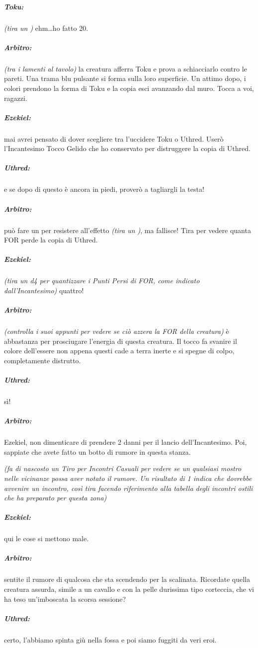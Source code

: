 \documentclass[itdr]{subfiles}
\begin{document}
{\subparagraph{Toku:} {\em (tira un )} ehm\ldots ho fatto 20.

\subparagraph{Arbitro:} {\em (tra i lamenti al tavolo)} la creatura afferra Toku e prova a schiacciarlo contro le pareti. Una trama blu pulsante si forma sulla loro superficie. Un attimo dopo, i colori prendono la forma di Toku e la copia esci avanzando dal muro. Tocca a voi, ragazzi.

\subparagraph{Ezekiel:} mai avrei pensato di dover scegliere tra l'uccidere Toku o Uthred. Userò l'Incantesimo Tocco Gelido che ho conservato per distruggere la copia di Uthred.

\subparagraph{Uthred:} e se dopo di questo è ancora in piedi, proverò a tagliargli la testa!

\subparagraph{Arbitro:} può fare un  per resistere all'effetto {\em (tira un )}, ma fallisce! Tira per vedere quanta FOR perde la copia di Uthred.

\subparagraph{Ezekiel:} {\em (tira un d4 per quantizzare i Punti Persi di FOR, come indicato dall'Incantesimo)} quattro!

\subparagraph{Arbitro:} {\em (controlla i suoi appunti per vedere se ciò azzera la FOR della creatura)} è abbastanza per prosciugare l'energia di questa creatura. Il tocco fa svanire il colore dell'essere non appena questi cade a terra inerte e si spegne di colpo, completamente distrutto.

\subparagraph{Uthred:} sì!

\subparagraph{Arbitro:} Ezekiel, non dimenticare di prendere 2 danni per il lancio dell'Incantesimo. Poi, sappiate che avete fatto un botto di rumore in questa stanza.

{\em (fa di nascosto un Tiro per Incontri Casuali per vedere se un qualsiasi mostro nelle vicinanze possa aver notato il rumore. Un risultato di 1 indica che dovrebbe avvenire un incontro, così tira facendo riferimento alla tabella degli incontri ostili che ha preparato per questa zona)}

\subparagraph{Ezekiel:} qui le cose si mettono male.

\break

\subparagraph{Arbitro:} sentite il rumore di qualcosa che sta scendendo per la scalinata. Ricordate quella creatura assurda, simile a un cavallo e con la pelle durissima tipo corteccia, che vi ha teso un'imboscata la scorsa sessione?

\subparagraph{Uthred:} certo, l'abbiamo spinta giù nella fossa e poi siamo fuggiti da veri eroi.

}
\end{document}
